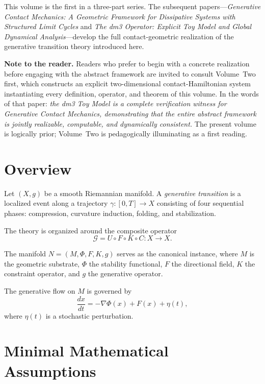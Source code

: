 \documentclass[12pt, oneside]{book}
\theoremstyle{plain}
\theoremstyle{definition}
\theoremstyle{remark}
\begin{document}
This volume is the first in a three-part series. The subsequent
papers---\emph{Generative Contact Mechanics: A Geometric Framework for
Dissipative Systems with Structured Limit Cycles} and \emph{The dm3
Operator: Explicit Toy Model and Global Dynamical Analysis}---develop
the full contact-geometric realization of the generative transition
theory introduced here.

\medskip

\noindent\textbf{Note to the reader.}
Readers who prefer to begin with a concrete realization before
engaging with the abstract framework are invited to consult
Volume~Two first, which constructs an explicit two-dimensional
contact-Hamiltonian system instantiating every definition, operator,
and theorem of this volume. In the words of that paper:
\emph{the dm3 Toy Model is a complete verification witness for
Generative Contact Mechanics, demonstrating that the entire abstract
framework is jointly realizable, computable, and dynamically consistent.}
The present volume is logically prior; Volume~Two is pedagogically
illuminating as a first reading.

\section{Overview}

Let $(X, g)$ be a smooth Riemannian manifold. A \emph{generative
transition} is a localized event along a trajectory
$\gamma : [0,T] \to X$ consisting of four sequential phases:
compression, curvature induction, folding, and stabilization.

The theory is organized around the composite operator
\[
\mathcal{G} = U \circ F \circ K \circ C : X \to X.
\]

The manifold $N = (M, \Phi, F, K, g)$ serves as the canonical
instance, where $M$ is the geometric substrate, $\Phi$ the stability
functional, $F$ the directional field, $K$ the constraint operator,
and $g$ the generative operator.

The generative flow on $M$ is governed by
\[
\frac{dx}{dt} = -\nabla \Phi(x) + F(x) + \eta(t),
\]
where $\eta(t)$ is a stochastic perturbation.

\section{Minimal Mathematical Assumptions}
\end{document}

